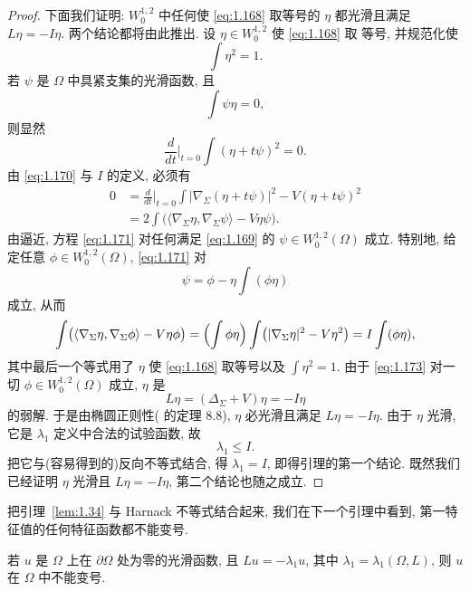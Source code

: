 \begin{proof}
下面我们证明: $W_0^{1,2}$ 中任何使 \eqref{eq:1.168} 取等号的 $\eta$ 都光滑且满足
$L\eta=-I\eta$. 两个结论都将由此推出. 设 $\eta\in W_0^{1,2}$ 使 \eqref{eq:1.168} 取
等号, 并规范化使
\[
\int\eta^{2}=1.
\]
若 $\psi$ 是 $\Omega$ 中具紧支集的光滑函数, 且
\begin{equation}
\int\psi\eta=0,
\label{eq:1.169}
\end{equation}
则显然
\begin{equation}
\frac{d}{dt}\Big|_{t=0}\int(\eta+t\psi)^{2}=0.
\label{eq:1.170}
\end{equation}
由 \eqref{eq:1.170} 与 $I$ 的定义, 必须有
\begin{equation}
\begin{aligned}
0&=\frac{d}{dt}\Big|_{t=0}\int|\nabla_{\Sigma}(\eta+t\psi)|^{2}
 -V(\eta+t\psi)^{2}\\
&=2\int\bigl(\langle\nabla_{\Sigma}\eta,\nabla_{\Sigma}\psi\rangle
 -V\eta\psi\bigr).
\end{aligned}
\label{eq:1.171}
\end{equation}
由逼近, 方程 \eqref{eq:1.171} 对任何满足 \eqref{eq:1.169} 的 $\psi\in W_0^{1,2}(\Omega)$
成立. 特别地, 给定任意 $\phi\in W_0^{1,2}(\Omega)$, \eqref{eq:1.171} 对
\begin{equation}
\psi=\phi-\eta\int(\phi\eta)
\label{eq:1.172}
\end{equation}
成立, 从而
\begin{equation}
\int\bigl(\langle\nabla_{\Sigma}\eta,\nabla_{\Sigma}\phi\rangle
 -V\eta\phi\bigr)
 =\Bigl(\int\phi\eta\Bigr)\int\bigl(|\nabla_{\Sigma}\eta|^{2}-V\eta^{2}\bigr)
 =I\int(\phi\eta),
\label{eq:1.173}
\end{equation}
其中最后一个等式用了 $\eta$ 使 \eqref{eq:1.168} 取等号以及 $\int\eta^{2}=1$. 由于
\eqref{eq:1.173} 对一切 $\phi\in W_0^{1,2}(\Omega)$ 成立, $\eta$ 是
\[
L\eta=(\Delta_{\Sigma}+V)\eta=-I\eta
\]
的弱解. 于是由椭圆正则性(\cite{GiTr} 的定理 8.8), $\eta$ 必光滑且满足
$L\eta=-I\eta$. 由于 $\eta$ 光滑, 它是 $\lambda_1$ 定义中合法的试验函数,
故
\begin{equation}
\lambda_1\leq I.
\label{eq:1.174}
\end{equation}
把它与(容易得到的)反向不等式结合, 得 $\lambda_1=I$, 即得引理的第一个结论.
既然我们已经证明 $\eta$ 光滑且 $L\eta=-I\eta$, 第二个结论也随之成立.
\end{proof}

把引理~\ref{lem:1.34} 与 Harnack 不等式结合起来, 我们在下一个引理中看到,
第一特征值的任何特征函数都不能变号.

\begin{lemma}
\label{lem:1.35}
若 $u$ 是 $\Omega$ 上在 $\partial\Omega$ 处为零的光滑函数, 且
$Lu=-\lambda_1u$, 其中 $\lambda_1=\lambda_1(\Omega,L)$, 则 $u$ 在 $\Omega$
中不能变号.
\end{lemma}

